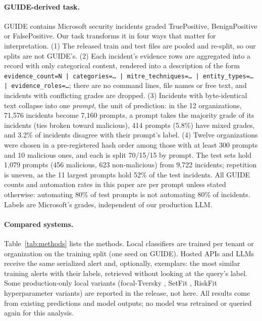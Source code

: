 \documentclass[letterpaper]{article} %
\begin{document}
\paragraph{GUIDE-derived task.} GUIDE \citep{guide2024} contains Microsoft security incidents graded TruePositive, BenignPositive or FalsePositive. Our task transforms it in four ways that matter for interpretation. (1) The released train and test files are pooled and re-split, so our splits are not GUIDE's. (2) Each incident's evidence rows are aggregated into a record with only categorical content, rendered into a description of the form \texttt{evidence\_count=N | categories=\ldots{} | mitre\_techniques=\ldots{} | entity\_types=\ldots{} | evidence\_roles=\ldots}; there are no command lines, file names or free text, and incidents with conflicting grades are dropped. (3) Incidents with byte-identical text collapse into one \emph{prompt}, the unit of prediction: in the 12 organizations, 71,576 incidents become 7,160 prompts, a prompt takes the majority grade of its incidents (ties broken toward malicious), 414 prompts (5.8\%) have mixed grades, and 3.2\% of incidents disagree with their prompt's label. (4) Twelve organizations were chosen in a pre-registered hash order among those with at least 300 prompts and 10 malicious ones, and each is split 70/15/15 by prompt. The test sets hold 1,079 prompts (456 malicious, 623 non-malicious) from 9,722 incidents; repetition is uneven, as the 11 largest prompts hold 52\% of the test incidents. All GUIDE counts and automation rates in this paper are per prompt unless stated otherwise: automating 80\% of test prompts is not automating 80\% of incidents. Labels are Microsoft's grades, independent of our production LLM.

\paragraph{Compared systems.} Table~\ref{tab:methods} lists the methods. Local classifiers are trained per tenant or organization on the training split (one seed on GUIDE). Hosted APIs and LLMs receive the same serialized alert and, optionally, exemplars: the most similar training alerts with their labels, retrieved without looking at the query's label. Some production-only local variants (focal-Tversky \citep{abraham2019focaltversky}, SetFit \citep{tunstall2022setfit}, RiskFit hyperparameter variants) are reported in the release, not here. All results come from existing predictions and model outputs; no model was retrained or queried again for this analysis.
\end{document}
